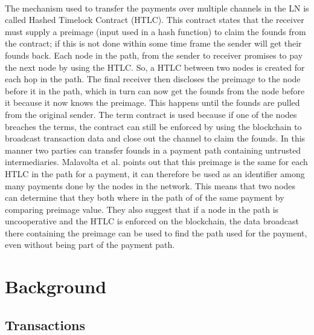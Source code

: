 \paragraph{}
The mechanism used to transfer the payments over multiple channels in the LN is called Hashed Timelock Contract (HTLC). This contract states that the receiver must supply a preimage (input used in a hash function) to claim the founds from the contract; if this is not done within some time frame the sender will get their founds back. Each node in the path, from the sender to receiver promises to pay the next node by using the HTLC. So, a HTLC between two nodes is created for each hop in the path. The final receiver then discloses the preimage to the node before it in the path, which in turn can now get the founds from the node before it because it now knows the preimage.  This happens until the founds are pulled from the original sender. The term contract is used because if one of the nodes breaches the terms, the contract can still be enforced by using the blockchain to broadcast transaction data and close out the channel to claim the founds. In this manner two parties can transfer founds in a payment path containing untrusted intermediaries. Malavolta et al. \cite{malavolta2017concurrency} points out that this preimage is the same for each HTLC in the path for a payment, it can therefore be used as an identifier among many payments done by the nodes in the network. This means that two nodes can determine that they both where in the path of of the same payment by comparing preimage value. They also suggest that if a node in the path is uncooperative and the HTLC is enforced on the blockchain, the data broadcast there containing the preimage can be used to find the path used for the payment, even without being part of the payment path.

\section{Background}

\subsection{Transactions}

